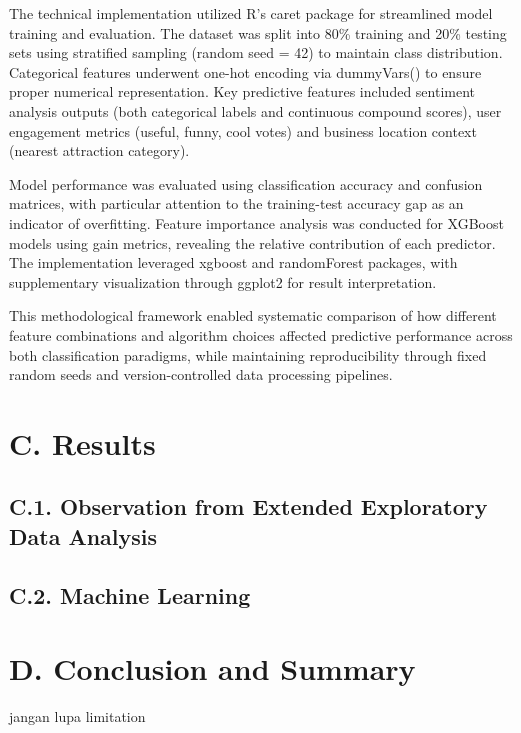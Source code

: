 \documentclass[
]{article}
\begin{document}
The technical implementation utilized R's caret package for streamlined
model training and evaluation. The dataset was split into 80\% training
and 20\% testing sets using stratified sampling (random seed = 42) to
maintain class distribution. Categorical features underwent one-hot
encoding via dummyVars() to ensure proper numerical representation. Key
predictive features included sentiment analysis outputs (both
categorical labels and continuous compound scores), user engagement
metrics (useful, funny, cool votes) and business location context
(nearest attraction category).

Model performance was evaluated using classification accuracy and
confusion matrices, with particular attention to the training-test
accuracy gap as an indicator of overfitting. Feature importance analysis
was conducted for XGBoost models using gain metrics, revealing the
relative contribution of each predictor. The implementation leveraged
xgboost and randomForest packages, with supplementary visualization
through ggplot2 for result interpretation.

This methodological framework enabled systematic comparison of how
different feature combinations and algorithm choices affected predictive
performance across both classification paradigms, while maintaining
reproducibility through fixed random seeds and version-controlled data
processing pipelines.

\section{C. Results}\label{c.-results}

\subsection{C.1. Observation from Extended Exploratory Data
Analysis}\label{c.1.-observation-from-extended-exploratory-data-analysis}

\subsection{C.2. Machine Learning}\label{c.2.-machine-learning}

\section{D. Conclusion and Summary}\label{d.-conclusion-and-summary}

jangan lupa limitation
\end{document}
